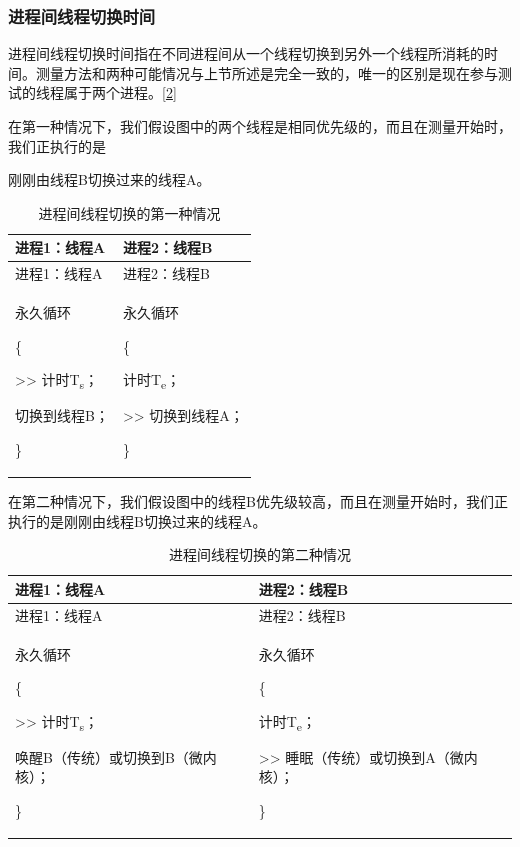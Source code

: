 \subsubsection{进程间线程切换时间}\label{subsubsec:1-inter-process-thread-switch}

进程间线程切换时间指在不同进程间从一个线程切换到另外一个线程所消耗的时间。测量方法和两种可能情况与上节所述是完全一致的，唯一的区别是现在参与测试的线程属于两个进程。\hyperref[cite:1-2]{{[}2{]}}

在第一种情况下，我们假设图中的两个线程是相同优先级的，而且在测量开始时，我们正执行的是

刚刚由线程B切换过来的线程A。

\begin{xltabular}{\textwidth}{@{}>{\hsize\raggedright\arraybackslash}X>{\hsize\raggedright\arraybackslash}X@{}}
\caption{进程间线程切换的第一种情况}\label{tab:1-3-inter-process-thread-switch-case-1}\\
\toprule
进程1：线程A & 进程2：线程B\tabularnewline
\endfirsthead
\toprule
进程1：线程A & 进程2：线程B\tabularnewline
\midrule
\endhead
\bottomrule
\endlastfoot
永久循环

\{

\textgreater\textgreater{} 计时T\textsubscript{s}；

切换到线程B；

\}\strut
 & 永久循环

\{

计时T\textsubscript{e}；

\textgreater\textgreater{} 切换到线程A；

\}\strut
\tabularnewline
\end{xltabular}

在第二种情况下，我们假设图中的线程B优先级较高，而且在测量开始时，我们正执行的是刚刚由线程B切换过来的线程A。

\begin{xltabular}{\textwidth}{@{}>{\hsize\raggedright\arraybackslash}X>{\hsize\raggedright\arraybackslash}X@{}}
\caption{进程间线程切换的第二种情况}\label{tab:1-4-inter-process-thread-switch-case-2}\\
\toprule
进程1：线程A & 进程2：线程B\tabularnewline
\endfirsthead
\toprule
进程1：线程A & 进程2：线程B\tabularnewline
\midrule
\endhead
\bottomrule
\endlastfoot
永久循环

\{

\textgreater\textgreater{} 计时T\textsubscript{s}；

唤醒B（传统）或切换到B（微内核）；

\}\strut
 & 永久循环

\{

计时T\textsubscript{e}；

\textgreater\textgreater{} 睡眠（传统）或切换到A（微内核）；

\}\strut
\tabularnewline
\end{xltabular}

